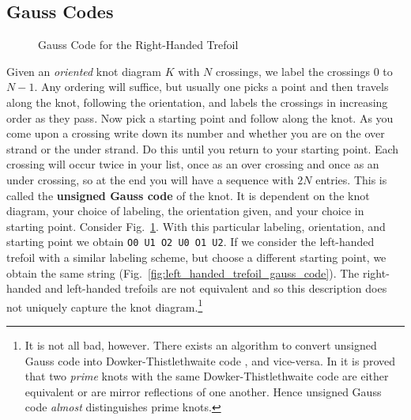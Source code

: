     \subsection{Gauss Codes}
        \begin{figure}
            \centering
            \caption{Gauss Code for the Right-Handed Trefoil}
            \label{fig:right_handed_trefoil_gauss_code}
        \end{figure}
        Given an \textit{oriented} knot diagram $K$ with $N$ crossings, we
        label the crossings $0$ to $N-1$. Any ordering will suffice, but
        usually one picks a point and then travels along the knot, following
        the orientation, and labels the crossings in increasing order as they
        pass. Now pick a starting point and follow along the knot. As you
        come upon a crossing write down its number and whether you are on the
        over strand or the under strand. Do this until you return to your
        starting point. Each crossing will occur twice in your list, once as an
        over crossing and once as an under crossing, so at the end you will
        have a sequence with $2N$ entries. This is called the
        \textbf{unsigned Gauss code} of the knot. It is dependent on the
        knot diagram, your choice of labeling, the orientation given, and your
        choice in starting point. Consider
        Fig.~\ref{fig:right_handed_trefoil_gauss_code}. With this particular
        labeling, orientation, and starting point we obtain
        \texttt{O0 U1 O2 U0 O1 U2}. If we consider the left-handed trefoil with
        a similar labeling scheme, but choose a different starting point, we
        obtain the same string (Fig.~\ref{fig:left_handed_trefoil_gauss_code}).
        The right-handed and left-handed trefoils are
        not equivalent \cite[p.~200-204]{DehnGroupTheoryAndTopology} and so
        this description does not uniquely capture the knot diagram.\footnote{%
            It is not all bad, however. There exists an algorithm to
            convert unsigned Gauss code into Dowker-Thistlethwaite code
            \cite{KatlasDTCode}, and vice-versa. In \cite{DOWKER198319} it is
            proved that two \textit{prime} knots with the same
            Dowker-Thistlethwaite code are either equivalent or are mirror
            reflections of one another. Hence unsigned Gauss code
            \textit{almost} distinguishes prime knots.
        }
